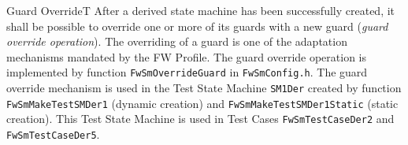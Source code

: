 \documentclass[requirements]{../fwprofile}
\begin{document}
\begin{fw_req}{Guard Override}{T}
{After a derived state machine has been successfully created, it shall be 
possible to override one or more of its guards with a new guard (\emph{guard override operation}).}
{The overriding of a guard is one of the adaptation mechanisms mandated 
by the FW Profile.}
{The guard override operation is implemented by function 
\texttt{FwSmOverrideGuard} in \texttt{FwSmConfig.h}.} 
{The guard override mechanism is used in the Test State Machine 
\texttt{SM1Der} created by function \texttt{FwSmMakeTestSMDer1} (dynamic creation) and 
\texttt{FwSmMakeTestSMDer1Static} (static creation). This Test State Machine is used in 
Test Cases \texttt{FwSmTestCaseDer2} and \texttt{FwSmTestCaseDer5}.}
\end{fw_req}
\end{document}
